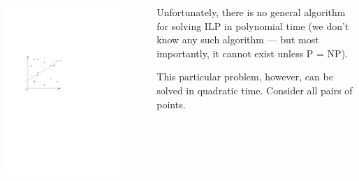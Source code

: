 \documentclass{beamer}
\renewcommand{\.}{\hskip .75pt}
\begin{document}
\begin{frame}
	\begin{columns}
		\begin{column}{0.5\textwidth}
			\begin{center}
				\includegraphics[width=0.88\textwidth]{separating_p}
			\end{center}
		\end{column}
	
		\begin{column}{0.5\textwidth}
			\pause Unfortunately, there is no general algorithm for solving ILP in polynomial time \pause (we don't know any such algorithm --- but most importantly, it cannot exist unless P = NP).
			\smallskip
			
			\pause This particular problem, however, can be solved in quadratic time.
			Consider all pairs of points.
		\end{column}
	\end{columns}
	
\end{frame}
\end{document}

